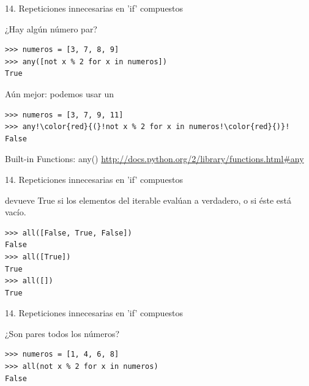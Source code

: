 \documentclass[14pt]{beamer}
\begin{document}
\begin{frame}[fragile]
  {14. \normalsize Repeticiones innecesarias en 'if' compuestos}
  \footnotesize
  \begin{exampleblock}
    {¿Hay algún número par?}
    \begin{lstlisting}
>>> numeros = [3, 7, 8, 9]
>>> any([not x % 2 for x in numeros])
True
    \end{lstlisting}
  \end{exampleblock}

  \normalsize
  \begin{alertblock}{}
    \centering
    Aún mejor: podemos usar un 
  \end{alertblock}

  \footnotesize
  \begin{exampleblock}{}
    \begin{lstlisting}[escapechar=!]
>>> numeros = [3, 7, 9, 11]
>>> any!\color{red}{(}!not x % 2 for x in numeros!\color{red}{)}!
False
    \end{lstlisting}
  \end{exampleblock}

  \small
  \begin{block}
    {\centering Built-in Functions: any()}
    \centering \url{http://docs.python.org/2/library/functions.html\#any}
  \end{block}
\end{frame}

\begin{frame}[fragile]
  {14. \normalsize Repeticiones innecesarias en 'if' compuestos}
  \begin{block}{}
    \centering
     devueve True si  los elementos
    del iterable evalúan a verdadero, o si éste está vacío.
  \end{block}

  \begin{exampleblock}{}
    \begin{lstlisting}
>>> all([False, True, False])
False
>>> all([True])
True
>>> all([])
True
    \end{lstlisting}
  \end{exampleblock}
\end{frame}

\begin{frame}[fragile]
  {14. \normalsize Repeticiones innecesarias en 'if' compuestos}
  \begin{exampleblock}
    {¿Son pares todos los números?}
    \begin{lstlisting}
>>> numeros = [1, 4, 6, 8]
>>> all(not x % 2 for x in numeros)
False
    \end{lstlisting}
  \end{exampleblock}
\end{frame}
\end{document}

